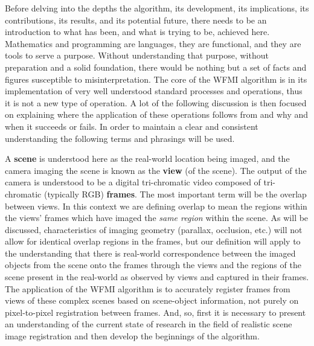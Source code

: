 %
%
%
%
%
%
%

%
%
%


Before delving into the depths the algorithm, its development, its implications, its contributions, its results, and its potential future, there needs to be an introduction to what has been, and what is trying to be, achieved here. Mathematics and programming are languages, they are functional, and they are tools to serve a purpose. Without understanding that purpose, without preparation and a solid foundation, there would be nothing but a set of facts and figures susceptible to misinterpretation. The core of the WFMI algorithm is in its implementation of very well understood standard processes and operations, thus it is not a new type of operation. A lot of the following discussion is then focused on explaining where the application of these operations follows from and why and when it succeeds or fails. In order to maintain a clear and consistent understanding the following terms and phrasings will be used.

A \textbf{scene} is understood here as the real-world location being imaged, and the camera imaging the scene is known as the \textbf{view} (of the scene). The output of the camera is understood to be a digital tri-chromatic video composed of tri-chromatic (typically RGB) \textbf{frames}. The most important term will be the overlap between views. In this context we are defining overlap to mean the regions within the views' frames which have imaged the \textit{same region} within the scene. As will be discussed, characteristics of imaging geometry (parallax, occlusion, etc.) will not allow for identical overlap regions in the frames, but our definition will apply to the understanding that there is real-world correspondence between the imaged objects from the scene onto the frames through the views and the regions of the scene present in the real-world as observed by views and captured in their frames. The application of the WFMI algorithm is to accurately register frames from views of these complex scenes based on scene-object information, not purely on pixel-to-pixel registration between frames. And, so, first it is necessary to present an understanding of the current state of research in the field of realistic scene image registration and then develop the beginnings of the algorithm.



